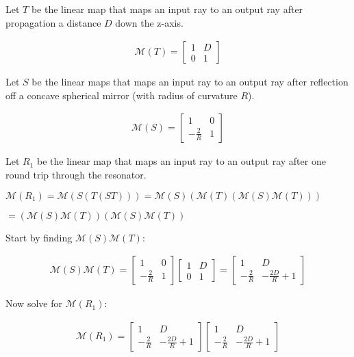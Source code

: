 \documentclass[fleqn]{article}
\begin{document}
\begin{enumerate}[nolistsep]
			\pagebreak
			Let $T$ be the linear map that maps an input ray to an output ray after propagation a distance $D$ down the z-axis.
			
			\begin{align*}
				\mathcal{M}(T) = \begin{bmatrix}1 & D\\ 0 & 1\end{bmatrix}
			\end{align*}
			
			Let $S$ be the linear maps that maps an input ray to an output ray after reflection off a concave spherical mirror (with radius of curvature $R$).
			
			\begin{align*}
				\mathcal{M}(S) = \begin{bmatrix} 1 & 0\\ -\frac{2}{R} & 1 \end{bmatrix}
			\end{align*}
			
			Let $R_1$ be the linear map that maps an input ray to an output ray after one round trip through the resonator.
			
			$\mathcal{M}(R_1) = \mathcal{M}(S(T(ST))) = \mathcal{M}(S)(\mathcal{M}(T)(\mathcal{M}(S)\mathcal{M}(T)))$
			
			$ = (\mathcal{M}(S)\mathcal{M}(T))(\mathcal{M}(S)\mathcal{M}(T))$
			
			Start by finding $\mathcal{M}(S)\mathcal{M}(T)$:
			
			\begin{align*}
				\mathcal{M}(S)\mathcal{M}(T) = \begin{bmatrix} 1 & 0\\ -\frac{2}{R} & 1 \end{bmatrix} \begin{bmatrix}1 & D\\ 0 & 1\end{bmatrix} = \begin{bmatrix}1 & D\\ -\frac{2}{R} & -\frac{2D}{R} + 1\end{bmatrix}
			\end{align*}
			
			Now solve for $\mathcal{M}(R_1)$:
			
			\begin{align*}
				\mathcal{M}(R_1) = \begin{bmatrix}1 & D\\ -\frac{2}{R} & -\frac{2D}{R} + 1\end{bmatrix}\begin{bmatrix}1 & D\\ -\frac{2}{R} & -\frac{2D}{R} + 1\end{bmatrix}
			\end{align*}
			

\end{enumerate}
\end{document}
